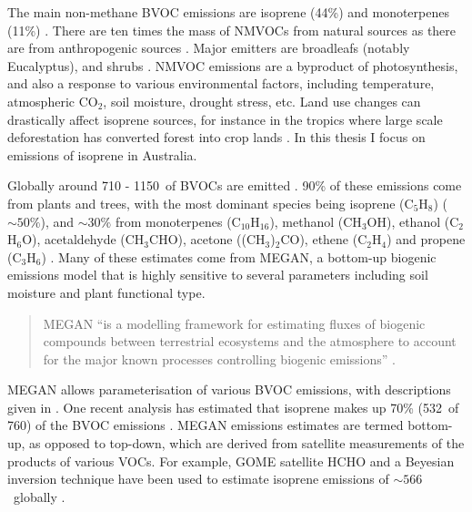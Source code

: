     The main non-methane BVOC emissions are isoprene (44\%) and monoterpenes (11\%) \parencite{Guenther2000, Kefauver2014}. 
    There are ten times the mass of NMVOCs from natural sources as there are from anthropogenic sources \parencite{Guenther2006, Kanakidou2005, Millet2006}.
    Major emitters are broadleafs (notably Eucalyptus), and shrubs \parencite{Guenther2006, Arneth2008, Niinemets2010, Monks2015}.
    NMVOC emissions are a byproduct of photosynthesis, and also a response to various environmental factors, including temperature, atmospheric CO$_2$, soil moisture, drought stress, etc.
    Land use changes can drastically affect isoprene sources, for instance in the tropics where large scale deforestation has converted forest into crop lands \parencite{Kanakidou2005}.
    In this thesis I focus on emissions of isoprene in Australia.
    
    Globally around 710 - 1150\tgcpyr ~of BVOCs are emitted \parencite{Guenther1995,Lathiere2006,Guenther2012, Messina2016}.
    90\% of these emissions come from plants and trees, with the most dominant species being isoprene (C$_5$H$_8$) ($\sim50\%$), and $\sim30\%$ from monoterpenes (C$_10$H$_16$), methanol (CH$_3$OH), ethanol (C$_2$H$_6$O), acetaldehyde (CH$_3$CHO), acetone ((CH$_3$)$_2$CO), ethene (C$_2$H$_4$) and propene (C$_3$H$_6$) \parencite{Guenther2012}.
    Many of these estimates come from MEGAN, a bottom-up biogenic emissions model that is highly sensitive to several parameters including soil moisture and plant functional type.
    \begin{quote}
      MEGAN ``is a modelling framework for estimating fluxes of biogenic compounds between terrestrial ecosystems and the atmosphere to account for the major known processes controlling biogenic emissions'' \parencite{Guenther2012}.
    \end{quote}
    MEGAN allows parameterisation of various BVOC emissions, with descriptions given in \textcite{Guenther2012}.
    One recent analysis has estimated that isoprene makes up 70\% (532\tgcpyr ~of 760\tgcpyr) of the BVOC emissions \parencite{Sindelarova2014}.
    MEGAN emissions estimates are termed bottom-up, as opposed to top-down, which are derived from satellite measurements of the products of various VOCs.
    For example, GOME satellite HCHO and a Beyesian inversion technique have been used to estimate isoprene emissions of $\sim566$\tgcpyr ~globally \parencite{Shim2005}. 
    
